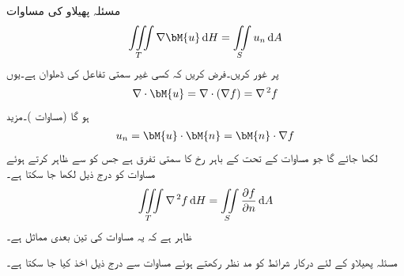 مسئلہ پھیلاو کی مساوات
\begin{align}\label{مساوات_خطی_تکمل_مسئلہ_پھیلاو_دوبارہ_الف}
\iiint\limits_T \nabla \bM{u}\dif H=\iint\limits_S u_n \dif A
\end{align}
پر غور کریں۔فرض کریں کہ  کسی غیر سمتی تفاعل کی ڈھلوان  ہے۔یوں
\begin{align*}
\nabla \cdot \bM{u}=\nabla \cdot (\nabla f)=\nabla^{\,2}f
\end{align*}
ہو گا (مساوات )۔مزید 
\begin{align*}
u_n=\bM{u}\cdot \bM{n}=\bM{n}\cdot \nabla f
\end{align*}
لکھا جائے گا جو مساوات  کے تحت  کے باہر رخ  کا سمتی تفرق ہے جس کو  سے ظاہر کرتے ہوئے  مساوات  کو درج ذیل لکھا جا سکتا ہے۔
\begin{align}\label{مساوات_خطی_تکمل_مسئلہ_پھیلاو_دوبارہ_ب}
\iiint\limits_T \nabla^{\,2}f\dif H=\iint\limits_S \frac{\partial f}{\partial n}\dif A
\end{align}
ظاہر ہے کہ یہ مساوات  کی تین بعدی مماثل ہے۔

مسئلہ پھیلاو کے لئے درکار شرائط کو مد نظر رکھتے ہوئے  مساوات  سے درج ذیل اخذ کیا جا سکتا ہے۔ 

